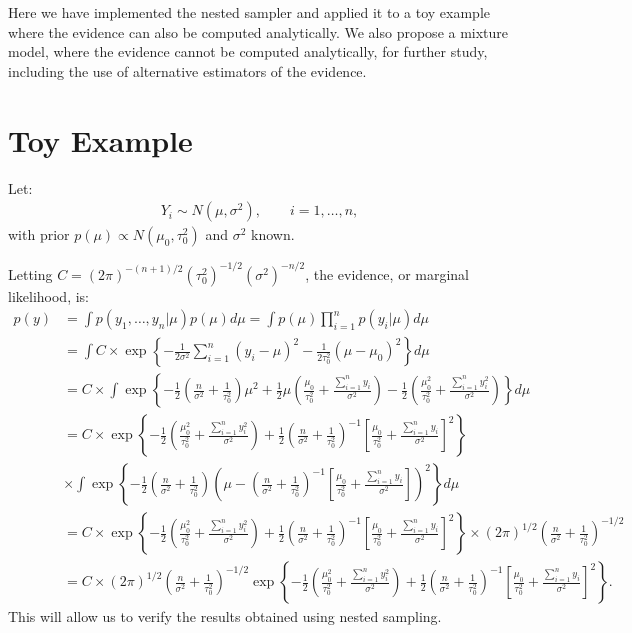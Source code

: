 \documentclass[11pt]{article}
\begin{document}
Here we have implemented the nested sampler and applied it to a
toy example where the evidence can also be computed analytically.
We also propose a mixture model, where the evidence cannot be computed
analytically, for further study, including the use of alternative
estimators of the evidence.

\section{Toy Example}
Let:
\begin{align*}
Y_{i} \sim{} N(\mu,\sigma^{2}) , \qquad i=1,\ldots,n ,
\end{align*}
with prior $p(\mu)\propto{}N(\mu_{0},\tau_{0}^{2})$ and $\sigma^{2}$ known. 

Letting $C=(2\pi)^{-(n+1)/2}(\tau_{0}^{2})^{-1/2}(\sigma^{2})^{-n/2}$, the evidence, or marginal likelihood, is:
\begin{align*}
 p(y) &= \int p(y_{1},\ldots,y_{n}|\mu)p(\mu)d\mu = \int p(\mu)\prod_{i=1}^{n}p(y_{i}|\mu) d\mu \\
 &= \int C \times \exp\left\{-\frac{1}{2\sigma^{2}}\sum_{i=1}^{n}(y_{i}-\mu)^{2} -\frac{1}{2\tau_{0}^{2}}(\mu-\mu_{0})^{2} \right\} d\mu \\
 &= C \times \int \exp\left\{-\frac{1}{2}\left(\frac{n}{\sigma^{2}}+\frac{1}{\tau_{0}^{2}}\right)\mu^{2} + \frac{1}{2}\mu\left(\frac{\mu_{0}}{\tau_{0}^{2}} + \frac{\sum_{i=1}^{n}y_{i}}{\sigma^{2}}\right) - \frac{1}{2}\left(\frac{\mu_{0}^{2}}{\tau_{0}^{2}} + \frac{\sum_{i=1}^{n}y_{i}^{2}}{\sigma^{2}}\right) \right\} d\mu \\
  &= C \times \exp\left\{ - \frac{1}{2}\left(\frac{\mu_{0}^{2}}{\tau_{0}^{2}} + \frac{\sum_{i=1}^{n}y_{i}^{2}}{\sigma^{2}}\right)
  + \frac{1}{2}\left(\frac{n}{\sigma^{2}}+\frac{1}{\tau_{0}^{2}}\right)^{-1}\left[\frac{\mu_{0}}{\tau_{0}^{2}} + \frac{\sum_{i=1}^{n}y_{i}}{\sigma^{2}}\right]^{2}\right\} \\
  & \times  \int \exp\left\{ -\frac{1}{2}\left(\frac{n}{\sigma^{2}}+\frac{1}{\tau_{0}^{2}}\right)\left(\mu - \left(\frac{n}{\sigma^{2}}+\frac{1}{\tau_{0}^{2}}\right)^{-1}\left[\frac{\mu_{0}}{\tau_{0}^{2}} + \frac{\sum_{i=1}^{n}y_{i}}{\sigma^{2}}\right]\right)^{2} \right\}  d\mu \\
 &=  C\times\exp\left\{ - \frac{1}{2}\left(\frac{\mu_{0}^{2}}{\tau_{0}^{2}} + \frac{\sum_{i=1}^{n}y_{i}^{2}}{\sigma^{2}}\right)
  + \frac{1}{2}\left(\frac{n}{\sigma^{2}}+\frac{1}{\tau_{0}^{2}}\right)^{-1}\left[\frac{\mu_{0}}{\tau_{0}^{2}} + \frac{\sum_{i=1}^{n}y_{i}}{\sigma^{2}}\right]^{2}\right\} \times{} (2\pi)^{1/2}\left(\frac{n}{\sigma^{2}}+\frac{1}{\tau_{0}^{2}}\right)^{-1/2} \\
   &= C\times(2\pi)^{1/2}\left(\frac{n}{\sigma^{2}}+\frac{1}{\tau_{0}^{2}}\right)^{-1/2}\exp\left\{ - \frac{1}{2}\left(\frac{\mu_{0}^{2}}{\tau_{0}^{2}} + \frac{\sum_{i=1}^{n}y_{i}^{2}}{\sigma^{2}}\right)
  + \frac{1}{2}\left(\frac{n}{\sigma^{2}}+\frac{1}{\tau_{0}^{2}}\right)^{-1}\left[\frac{\mu_{0}}{\tau_{0}^{2}} + \frac{\sum_{i=1}^{n}y_{i}}{\sigma^{2}}\right]^{2}\right\} .
\end{align*}
This will allow us to verify the results obtained using nested sampling. 
\end{document}
